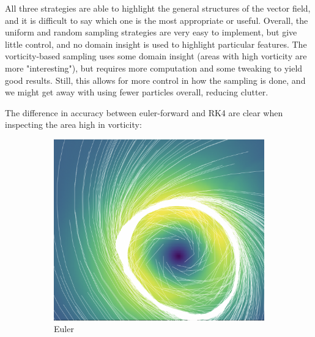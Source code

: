\documentclass{article}
\begin{document}
All three strategies are able to highlight the general structures of the vector field, and it is difficult to say which one
is the most appropriate or useful. Overall, the uniform and random sampling strategies are very easy to implement, but give little control,
and no domain insight is used to highlight particular features. The vorticity-based sampling uses some domain insight (areas with high vorticity are more "interesting"), but
requires more computation and some tweaking to yield good results. Still, this allows for more control in how the sampling is done, and we might
get away with using fewer particles overall, reducing clutter.

The difference in accuracy between euler-forward and RK4 are clear when inspecting the area high in vorticity:
\begin{figure}[h!]
    \centering
    \begin{subfigure}{0.48\textwidth}
        \centering
        \includegraphics[width=\textwidth, angle=0]{euler.png}
        \caption{Euler}
    \end{subfigure}
    \hfill
    \begin{subfigure}{0.48\textwidth}
        \centering

\end{subfigure}
\end{figure}
\end{document}
